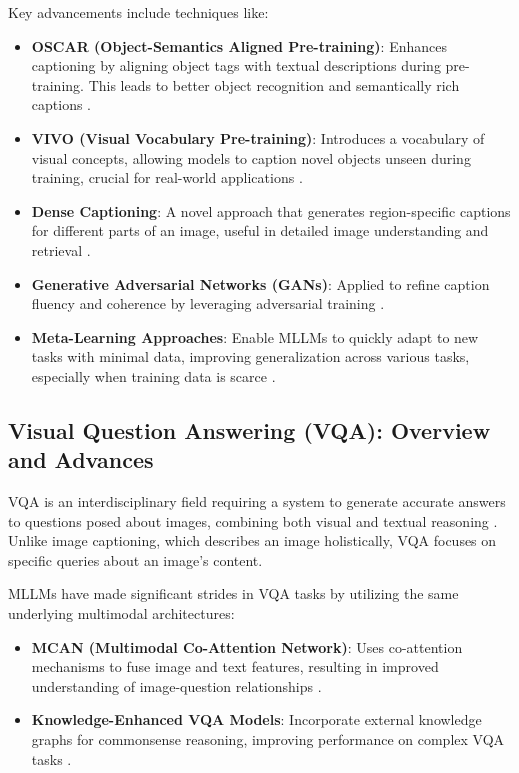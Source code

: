 \documentclass{article}
\begin{document}
Key advancements include techniques like:
\begin{itemize}
    \item \textbf{OSCAR (Object-Semantics Aligned Pre-training)}: Enhances captioning by aligning object tags with textual descriptions during pre-training. This leads to better object recognition and semantically rich captions \cite{icmeta2019oscar}.
    \item \textbf{VIVO (Visual Vocabulary Pre-training)}: Introduces a vocabulary of visual concepts, allowing models to caption novel objects unseen during training, crucial for real-world applications \cite{icmeta2019vivo}.
    \item \textbf{Dense Captioning}: A novel approach that generates region-specific captions for different parts of an image, useful in detailed image understanding and retrieval \cite{icmeta2020densecap}.
    \item \textbf{Generative Adversarial Networks (GANs)}: Applied to refine caption fluency and coherence by leveraging adversarial training \cite{icmeta2021gan}.
    \item \textbf{Meta-Learning Approaches}: Enable MLLMs to quickly adapt to new tasks with minimal data, improving generalization across various tasks, especially when training data is scarce \cite{icmeta2019meta}.
\end{itemize}

\subsection{Visual Question Answering (VQA): Overview and Advances}
VQA is an interdisciplinary field requiring a system to generate accurate answers to questions posed about images, combining both visual and textual reasoning \cite{vqa_survey2023}. Unlike image captioning, which describes an image holistically, VQA focuses on specific queries about an image's content.

MLLMs have made significant strides in VQA tasks by utilizing the same underlying multimodal architectures:
\begin{itemize}
    \item \textbf{MCAN (Multimodal Co-Attention Network)}: Uses co-attention mechanisms to fuse image and text features, resulting in improved understanding of image-question relationships \cite{mcan_vqa2019}.
    \item \textbf{Knowledge-Enhanced VQA Models}: Incorporate external knowledge graphs for commonsense reasoning, improving performance on complex VQA tasks \cite{lan2023improvingzeroshotvisualquestion}.
\end{itemize}
\end{document}

